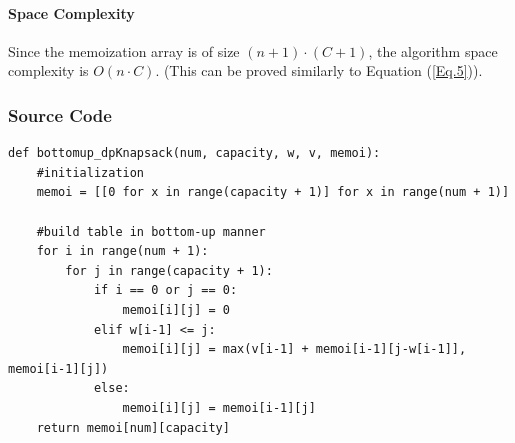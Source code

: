 \documentclass{article}
\begin{document}
\paragraph{Space Complexity}
Since the memoization array is of size $(n+1) \cdot (C+1)$, the algorithm space complexity is $O(n\cdot C)$. (This can be proved similarly to Equation (\ref{Eq.5})).

\subsubsection{Source Code}
\begin{lstlisting}[breaklines=true]
def bottomup_dpKnapsack(num, capacity, w, v, memoi):
    #initialization
    memoi = [[0 for x in range(capacity + 1)] for x in range(num + 1)]
    
    #build table in bottom-up manner
    for i in range(num + 1): 
        for j in range(capacity + 1): 
            if i == 0 or j == 0: 
                memoi[i][j] = 0
            elif w[i-1] <= j:
                memoi[i][j] = max(v[i-1] + memoi[i-1][j-w[i-1]], memoi[i-1][j]) 
            else: 
                memoi[i][j] = memoi[i-1][j]
    return memoi[num][capacity]
\end{lstlisting}
\end{document}
